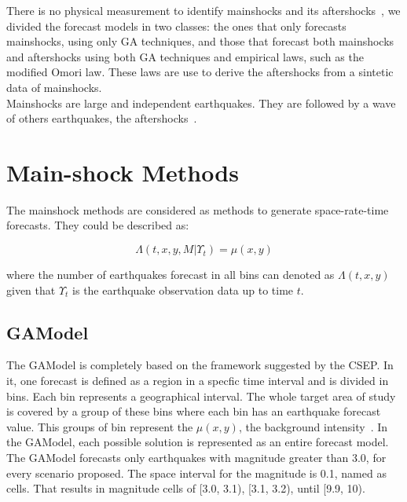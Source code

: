 There is no physical measurement to identify mainshocks and its aftershocks~\cite{schorlemmer2010first}, we divided the forecast models in two classes: the ones that only forecasts mainshocks, using only GA techniques, and those that forecast both mainshocks and aftershocks using both GA techniques and empirical laws, such as the modified Omori law. These laws are use to derive the aftershocks from a sintetic data of mainshocks.\\

Mainshocks are large and independent earthquakes. They are followed by a wave of others earthquakes, the aftershocks~\cite{schorlemmer2010first}.\\

\section{Main-shock Methods}\label{mainshocksMethods}
The mainshock methods are considered as methods to generate space-rate-time forecasts. They could be described as:

\begin{equation}\label{gamodel}
 \Lambda(t,x,y,M|\Upsilon_t) = \mu(x,y)
\end{equation}

where the number of earthquakes forecast in all bins can denoted as $\Lambda(t,x,y)$~\cite{zechar2010evaluating} given that $\Upsilon_t$ is the earthquake observation data up to time $t$.\\

\subsection{GAModel}\label{GAModel}
The GAModel is completely based on the framework suggested by the CSEP. In it, one forecast is defined as a region in a specfic time interval and is divided in bins. Each bin represents a geographical interval. The whole target area of study is covered by a group of these bins where each bin has an earthquake forecast value. This groups of bin represent the $\mu(x,y)$, the background intensity~\cite{zhuang2004analyzing}. In the GAModel, each possible solution is represented as an entire forecast model.\\

The GAModel forecasts only earthquakes with magnitude greater than 3.0, for every scenario proposed. The space interval for the magnitude is 0.1, named as cells. That results in magnitude cells of [3.0, 3.1), [3.1, 3.2), until [9.9, 10).\\

